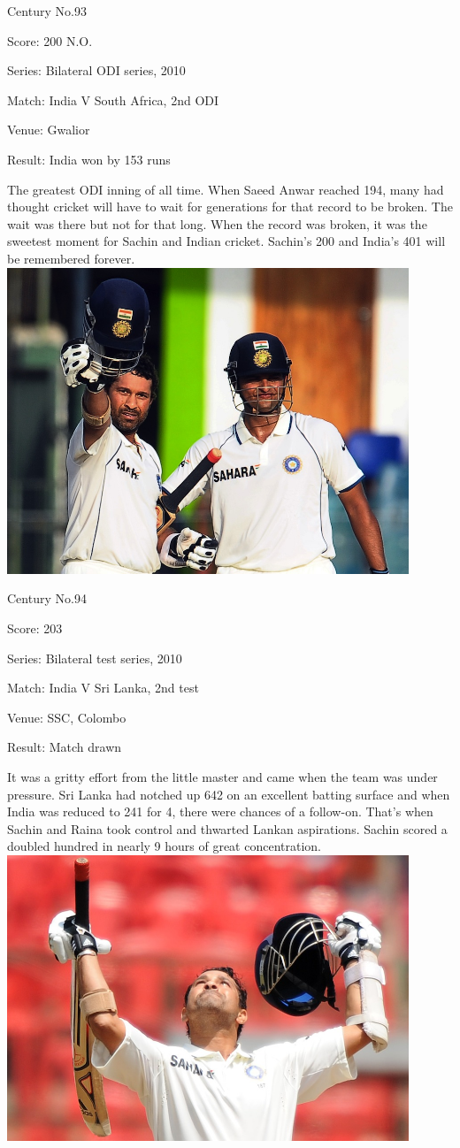 \documentclass[11pt, a4paper]{article}
\begin{document}
Century No.93 

Score: 200 N.O. 

Series: Bilateral ODI series, 2010 

Match: India V South Africa, 2nd ODI 

Venue: Gwalior 

Result: India won by 153 runs 

The greatest ODI inning of all time. When Saeed Anwar reached 194, many had thought cricket will have to wait for generations for that record to be broken. The wait was there but not for that long. When the record was broken, it was the sweetest moment for Sachin and Indian cricket. Sachin's 200 and India's 401 will be remembered forever.
\newpage
\includegraphics[width=0.9\textwidth]{pics/94.jpg}

Century No.94 

Score: 203 

Series: Bilateral test series, 2010 

Match: India V Sri Lanka, 2nd test 

Venue: SSC, Colombo 

Result: Match drawn 

It was a gritty effort from the little master and came when the team was under pressure. Sri Lanka had notched up 642 on an excellent batting surface and when India was reduced to 241 for 4, there were chances of a follow-on. That's when Sachin and Raina took control and thwarted Lankan aspirations. Sachin scored a doubled hundred in nearly 9 hours of great concentration.
\newpage
\includegraphics[width=0.9\textwidth]{pics/95.jpg}
\end{document}
